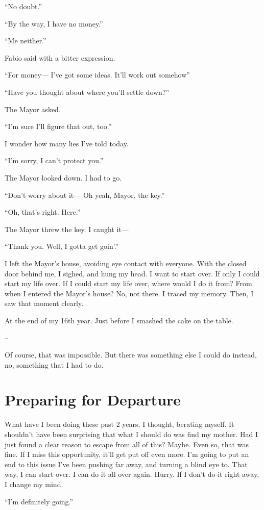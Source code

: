 \documentclass[oneside]{book}
\begin{document}
“No doubt.”

“By the way, I have no money.”

“Me neither.”

Fabio said with a bitter expression.

“For money— I’ve got some ideas. It’ll work out somehow”

“Have you thought about where you’ll settle down?”

The Mayor asked.

“I’m sure I’ll figure that out, too.”

I wonder how many lies I’ve told today.

“I’m sorry, I can’t protect you.”

The Mayor looked down. I had to go.

“Don’t worry about it— Oh yeah, Mayor, the key.”

“Oh, that’s right. Here.”

The Mayor threw the key. I caught it—

“Thank you. Well, I gotta get goin’.”

I left the Mayor’s house, avoiding eye contact with everyone. With the closed door behind me, I sighed, and hung my head. I want to start over. If only I could start my life over. If I could start my life over, where would I do it from? From when I entered the Mayor’s house? No, not there. I traced my memory. Then, I saw that moment clearly.

At the end of my 16th year. Just before I smashed the cake on the table.

–

Of course, that was impossible. But there was something else I could do instead, no, something that I had to do.

\chapter{Preparing for Departure}
What have I been doing these past 2 years, I thought, berating myself. It shouldn’t have been surprising that what I should do was find my mother. Had I just found a clear reason to escape from all of this? Maybe. Even so, that was fine. If I miss this opportunity, it’ll get put off even more. I’m going to put an end to this issue I’ve been pushing far away, and turning a blind eye to. That way, I can start over. I can do it all over again. Hurry. If I don’t do it right away, I change my mind.

“I’m definitely going.”
\end{document}
